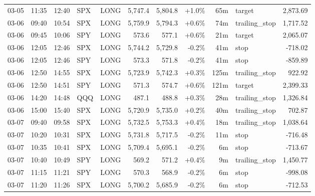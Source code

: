 \documentclass[11pt,a4paper,twoside]{article}
\begin{document}
\begin{center}
\begin{longtable}{>{\color{txtmain}}l l l l l r r r r >{\color{txtmain}}l r}
03-05 & 11:35 & 12:40 & SPX & LONG & 5,747.4 & 5,804.8 & \textcolor{wingreen}{+1.0\%} & 65m & target & \textcolor{wingreen}{2,873.69} \\
03-06 & 09:40 & 10:54 & SPX & LONG & 5,759.9 & 5,794.3 & \textcolor{wingreen}{+0.6\%} & 74m & trailing\_stop & \textcolor{wingreen}{1,717.52} \\
03-06 & 09:45 & 10:06 & SPY & LONG & 573.6 & 577.1 & \textcolor{wingreen}{+0.6\%} & 21m & target & \textcolor{wingreen}{2,065.07} \\
03-06 & 12:05 & 12:46 & SPX & LONG & 5,744.2 & 5,729.8 & \textcolor{lossred}{-0.2\%} & 41m & stop & \textcolor{lossred}{-718.02} \\
03-06 & 12:05 & 12:46 & SPY & LONG & 573.3 & 571.8 & \textcolor{lossred}{-0.2\%} & 41m & stop & \textcolor{lossred}{-859.89} \\
03-06 & 12:50 & 14:55 & SPX & LONG & 5,723.9 & 5,742.3 & \textcolor{wingreen}{+0.3\%} & 125m & trailing\_stop & \textcolor{wingreen}{922.92} \\
03-06 & 12:50 & 14:51 & SPY & LONG & 571.3 & 574.7 & \textcolor{wingreen}{+0.6\%} & 121m & target & \textcolor{wingreen}{2,399.33} \\
03-06 & 14:20 & 14:48 & QQQ & LONG & 487.1 & 488.8 & \textcolor{wingreen}{+0.3\%} & 28m & trailing\_stop & \textcolor{wingreen}{1,326.84} \\
03-06 & 15:00 & 15:40 & SPX & LONG & 5,720.9 & 5,735.0 & \textcolor{wingreen}{+0.2\%} & 40m & trailing\_stop & \textcolor{wingreen}{702.87} \\
03-07 & 09:40 & 09:58 & SPX & LONG & 5,732.5 & 5,753.3 & \textcolor{wingreen}{+0.4\%} & 18m & trailing\_stop & \textcolor{wingreen}{1,038.64} \\
03-07 & 10:20 & 10:31 & SPX & LONG & 5,731.8 & 5,717.5 & \textcolor{lossred}{-0.2\%} & 11m & stop & \textcolor{lossred}{-716.48} \\
03-07 & 10:35 & 10:41 & SPX & LONG & 5,709.4 & 5,695.1 & \textcolor{lossred}{-0.2\%} & 6m & stop & \textcolor{lossred}{-713.67} \\
03-07 & 10:40 & 10:49 & SPY & LONG & 569.2 & 571.2 & \textcolor{wingreen}{+0.4\%} & 9m & trailing\_stop & \textcolor{wingreen}{1,450.77} \\
03-07 & 11:15 & 11:21 & SPY & LONG & 570.3 & 568.9 & \textcolor{lossred}{-0.2\%} & 6m & stop & \textcolor{lossred}{-998.08} \\
03-07 & 11:20 & 11:26 & SPX & LONG & 5,700.2 & 5,685.9 & \textcolor{lossred}{-0.2\%} & 6m & stop & \textcolor{lossred}{-712.53} \\

\end{longtable}
\end{center}
\end{document}
